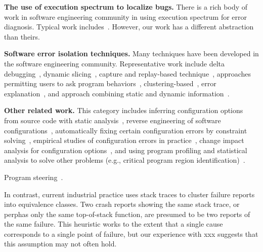 \textbf{The use of execution spectrum to localize bugs.} There is a rich body of
work in software engineering community in using execution spectrum for error diagnosis.
Typical work includes~\cite{Liblit:2005:SSBI, Santelices:2009:LFU, Reps:1997:UPP,
Yilmaz:2008:TTF}. However, our work has a different abstraction than theirs.

\textbf{Software error isolation techniques.} Many techniques have been developed
in the software engineering community. Representative work include delta debugging~\cite{Zeller:2002:ICC},
dynamic slicing~\cite{Zhang:2006:LFT},
capture and replay-based technique~\cite{Qi:2011:LFE}, approaches permitting
users to ask program behaviors~\cite{Ko:2008:DRA},
clustering-based~\cite{Dickinson:2001:FFC},
error explanation~\cite{Groce:2006:EED},
and approach combining static and dynamic information~\cite{Holmes:2011:IPT, Zhang:2008:EIF}.


\textbf{Other related work.} This category includes inferring configuration options
from source code with static analysis~\cite{Rabkin:2011:SEP}, 
reverse engineering of software configurations~\cite{Wang:2008:TAR}, automatically
fixing certain configuration errors by constraint solving~\cite{rangefix},
empirical studies of configuration errors in practice~\cite{Yin:2011:ESC, Hubaux:2012},
change impact analysis for configuration options~\cite{configimpact},
and using program profiling and statistical analysis to solve
other problems (e.g., critical program region identification)~\cite{Carbin:2010:AIC}.

Program steering~\cite{Lin:2004:IAM}.


In contrast, current industrial practice uses stack traces to cluster
failure reports into equivalence classes. Two crash reports showing
the same stack trace, or perphas only the same top-of-stack function,
are presumed to be two reports of the same failure. This heuristic
works to the extent that a single cause corresponds to a single point
of failure, but our experience with xxx suggests that this
assumption may not often hold.

